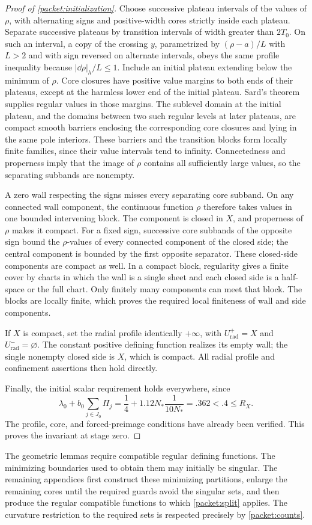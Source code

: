 \begin{proof}[Proof of \cref{packet:initialization}]
Choose successive plateau intervals of the values of $\rho$, with
alternating signs and positive-width cores strictly inside each
plateau.  Separate successive plateaus by transition intervals of
width greater than $2T_0$.  On such an interval, a copy of the crossing
$y$, parametrized by $(\rho-a)/L$ with $L>2$ and with sign reversed
on alternate intervals, obeys the same profile inequality because
$|\dd\rho|_h/L\le1$.  Include an initial plateau extending below the
minimum of $\rho$.  Core closures have positive value margins to
both ends of their plateaus, except at the harmless lower end of the
initial plateau.  Sard's theorem supplies regular values in those
margins.  The sublevel domain at the initial plateau, and the domains
between two such regular levels at later plateaus, are compact smooth
barriers enclosing the corresponding core closures and lying in the
same pole interiors.  These barriers and the transition blocks form
locally finite families, since their value intervals tend to infinity.
Connectedness and properness imply that the image of $\rho$ contains
all sufficiently large values, so the separating subbands are nonempty.

A zero wall respecting the signs misses every separating core
subband.  On any connected wall component, the continuous function
$\rho$ therefore takes values in one bounded intervening block.
The component is closed in $X$, and properness of $\rho$ makes it
compact.  For a fixed sign, successive core subbands of the opposite
sign bound the $\rho$-values of every connected component of the
closed side; the central component is bounded by the first opposite
separator.  These closed-side components are compact as well.
In a compact block, regularity gives a finite cover by charts in
which the wall is a single sheet and each closed side is a half-space
or the full chart.  Only finitely many components can meet that block.
The blocks are locally finite, which proves the required local
finiteness of wall and side components.

If $X$ is compact, set the radial profile identically $+\infty$, with
$U_{\mathrm{rad}}^+=X$ and $U_{\mathrm{rad}}^-=\varnothing$.
The constant positive defining function realizes its empty wall;
the single nonempty closed side is $X$, which is compact.  All radial
profile and confinement assertions then hold directly.

Finally, the initial scalar requirement holds everywhere, since
\[
 \lambda_0+b_0\sum_{j\in J_0}\Pi_j
 =\frac14+1.12N_*\frac{1}{10N_*}
 =.362<.4\le R_X.
\]
The profile, core, and forced-preimage conditions have already been
verified.  This proves the invariant at stage zero.
\end{proof}

The geometric lemmas require compatible regular defining functions.
The minimizing boundaries used to obtain them may initially be
singular.  The remaining appendices first construct these minimizing
partitions, enlarge the remaining cores until the required guards
avoid the singular sets, and then produce the regular compatible functions to which
\cref{packet:split} applies.  The curvature restriction to the required
sets is respected precisely by \cref{packet:counts}.
